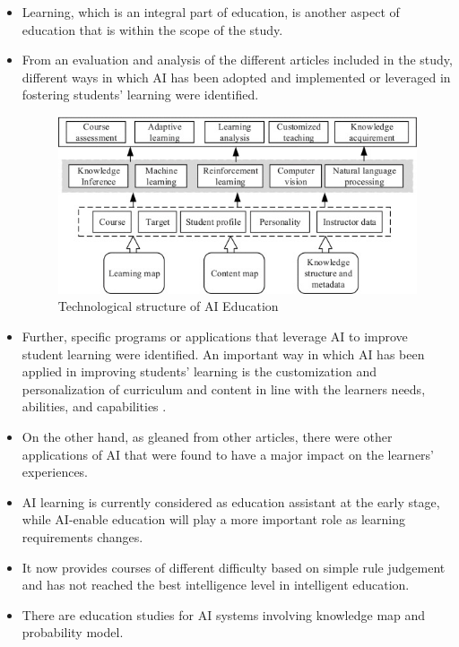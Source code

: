 \documentclass[conference]{IEEEtran}
\begin{document}
\begin{itemize}
\item Learning, which is an integral part of education, is another aspect of education that is within the scope of the study. 
\item From an evaluation and analysis of the different articles included in the study, different ways in which AI has been adopted and implemented or leveraged in fostering students’ learning were identified.
\vspace{-3 mm}
\begin{center}
\begin{figure}[h]
\caption{Technological structure of AI Education}
\vspace{5 mm}
\includegraphics[width=9 cm]{graph2}
\end{figure}
\end{center}
\vspace{-3 mm}
\item Further, specific programs or applications that leverage AI to improve student learning were identified. An important way in which AI has been applied in improving students’ learning is the customization and personalization of curriculum and content in line with the learners needs, abilities, and capabilities \cite{b3}.
\item On the other hand, as gleaned from other articles, there were other applications of AI that were found to have a major impact on the learners’ experiences. 
\item AI learning is currently considered as education assistant at the early stage, while AI-enable education will play a more important role as learning requirements changes. 
\item It now provides courses of different difficulty based on simple rule judgement and has not reached the best intelligence level in intelligent education. 
\item There are education studies for AI systems involving knowledge map and probability model\cite{b2}.
\end{itemize}
\end{document}
